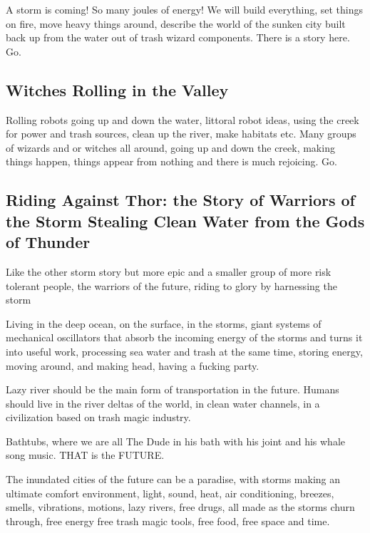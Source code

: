 A storm is coming! So many joules of energy! We will build everything,
set things on fire, move heavy things around, describe the world of the
sunken city built back up from the water out of trash wizard components.
There is a story here. Go.

\subsection{Witches Rolling in the
Valley}\label{witches-rolling-in-the-valley}

Rolling robots going up and down the water, littoral robot ideas, using
the creek for power and trash sources, clean up the river, make habitats
etc. Many groups of wizards and or witches all around, going up and down
the creek, making things happen, things appear from nothing and there is
much rejoicing. Go.

\subsection{Riding Against Thor: the Story of Warriors of the Storm
Stealing Clean Water from the Gods of
Thunder}\label{riding-against-thor-the-story-of-warriors-of-the-storm-stealing-clean-water-from-the-gods-of-thunder}

Like the other storm story but more epic and a smaller group of more
risk tolerant people, the warriors of the future, riding to glory by
harnessing the storm

Living in the deep ocean, on the surface, in the storms, giant systems
of mechanical oscillators that absorb the incoming energy of the storms
and turns it into useful work, processing sea water and trash at the
same time, storing energy, moving around, and making head, having a
fucking party.

Lazy river should be the main form of transportation in the future.
Humans should live in the river deltas of the world, in clean water
channels, in a civilization based on trash magic industry.

Bathtubs, where we are all The Dude in his bath with his joint and his
whale song music. THAT is the FUTURE.

The inundated cities of the future can be a paradise, with storms making
an ultimate comfort environment, light, sound, heat, air conditioning,
breezes, smells, vibrations, motions, lazy rivers, free drugs, all made
as the storms churn through, free energy free trash magic tools, free
food, free space and time.

